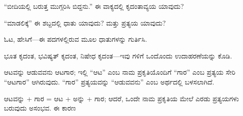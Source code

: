 \vspace{2.5pt plus 3pt minus 0.5pt}\noindent\hspace*{1.2em}\hspace{0.55em}“ಬೀದಿಯಲ್ಲಿ ಬರುತ್ತ ಮುಗ್ಗರಿಸಿ ಬಿದ್ದನು.” ಈ ವಾಕ್ಯದಲ್ಲಿ ಕೃದಂತಾವ್ಯಯ ಯಾವುದು?\par

\vspace{2.5pt plus 3pt minus 0.5pt}\noindent\hspace*{1.2em}\hspace{0.55em}“ಮಾಡಲಿಕ್ಕೆ” ಈ ಶಬ್ದದಲ್ಲಿ ಧಾತು ಯಾವುದು? ಮತ್ತು ಪ್ರತ್ಯಯ ಯಾವುದು?\par

\vspace{2.5pt plus 3pt minus 0.5pt}\noindent\hspace*{1.2em}\hspace{0.55em}ಓಟ, ಹೇಸಿಗೆ—ಈ ಪದಗಳಲ್ಲಿರುವ ಮೂಲ ಧಾತುಗಳನ್ನು ಗುರ್ತಿಸಿ.\par

\vspace{2.5pt plus 3pt minus 0.5pt}\noindent\hspace*{1.2em}\hspace{0.55em}ಭೂತ ಕೃದಂತ, ಭವಿಷ್ಯತ್‌ ಕೃದಂತ, ನಿಷೇಧ ಕೃದಂತ—ಇವು ಗಳಿಗೆ ಒಂದೊಂದು ಉದಾಹರಣೆಯನ್ನು ಕೊಡಿ.\par


\indent ಆಟವನ್ನು ಆಡುವವನು ಆಟಗಾರ; ಇಲ್ಲಿ “ಆಟ” ಎಂಬ ನಾಮ ಪ್ರಕೃತಿಯೊಂದಿಗೆ “ಗಾರ” ಎಂಬ ಪ್ರತ್ಯಯ ಸೇರಿ “ಆಟಗಾರ” ಆಗಿರುವುದು. “ಗಾರ” ಪ್ರತ್ಯಯವನ್ನು “ಆಡುವವನು” ಎಂಬ ಅರ್ಥದಲ್ಲಿ ಬಳಸಲಾಗಿದೆ.\par

\indent ಆಟವನ್ನು + ಗಾರ = ಆಟ + ಅನ್ನು + ಗಾರ; ಆದರೆ, ಒಂದೇ ನಾಮ ಪ್ರಕೃತಿಯ ಮೇಲೆ ಎರಡು ಪ್ರತ್ಯಯಗಳು ಬರುವುದು ಅಸಂಭವ. ಈ ಕಾರಣ\kbvcontinues
